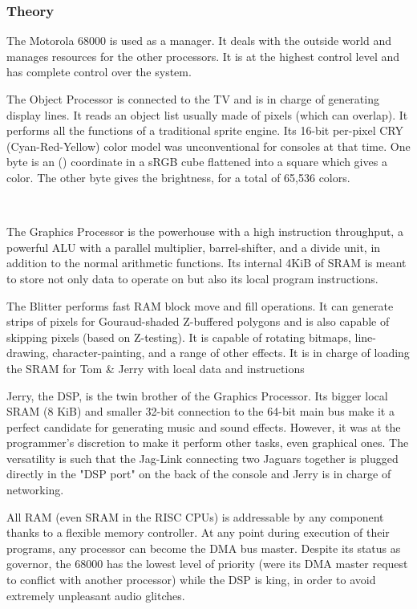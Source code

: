 \subsubsection{Theory}
\par
The Motorola 68000 is used as a manager. It deals with the outside world and manages resources for the other processors. It is at the highest control level and has complete control over the system.\\
\par
The Object Processor is connected to the TV and is in charge of generating display lines. It reads an object list usually made of pixels (which can overlap). It performs all the functions of a traditional sprite engine. Its 16-bit per-pixel CRY (Cyan-Red-Yellow) color model was unconventional for consoles at that time. One byte is an () coordinate in a sRGB cube flattened into a square which gives a color. The other byte gives the brightness, for a total of 65,536 colors.\\
\par
{}\\


\par
The Graphics Processor is the powerhouse with a high instruction throughput, a powerful ALU with a parallel multiplier, barrel-shifter, and a divide unit, in addition to the normal arithmetic functions. Its internal 4KiB of SRAM is meant to store not only data to operate on but also its local program instructions.\\
\par
The Blitter performs fast RAM block move and fill operations. It can generate strips of pixels for Gouraud-shaded Z-buffered polygons and is also capable of skipping pixels (based on Z-testing). It is capable of rotating bitmaps, line-drawing, character-painting, and a range of other effects. It is in charge of loading the SRAM for Tom \& Jerry with local data and instructions\\
\par
Jerry, the DSP, is the twin brother of the Graphics Processor. Its bigger local SRAM (8 KiB) and smaller 32-bit connection to the 64-bit main bus make it a perfect candidate for generating music and sound effects. However, it was at the programmer's discretion to make it perform other tasks, even graphical ones. The versatility is such that the Jag-Link connecting two Jaguars together is plugged directly in the "DSP port" on the back of the console and Jerry is in charge of networking.\\
\par
All RAM (even SRAM in the RISC CPUs) is addressable by any component thanks to a flexible memory controller. At any point during execution of their programs, any processor can become the DMA bus master. Despite its status as governor, the 68000 has the lowest level of priority (were its DMA master request to conflict with another processor) while the DSP is king, in order to avoid extremely unpleasant audio glitches.
\par



